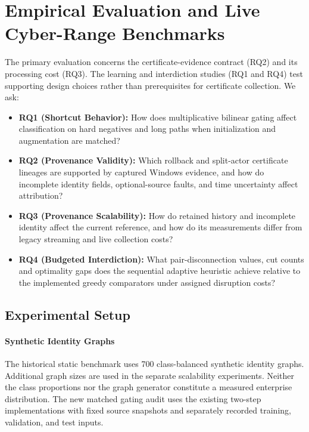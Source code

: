 \section{Empirical Evaluation and Live Cyber-Range Benchmarks}
\label{sec:evaluation}

The primary evaluation concerns the certificate-evidence contract (RQ2) and its processing cost (RQ3). The learning and interdiction studies (RQ1 and RQ4) test supporting design choices rather than prerequisites for certificate collection. We ask:
\begin{itemize}
    \item \textbf{RQ1 (Shortcut Behavior):} How does multiplicative bilinear gating affect classification on hard negatives and long paths when initialization and augmentation are matched?
    \item \textbf{RQ2 (Provenance Validity):} Which rollback and split-actor certificate lineages are supported by captured Windows evidence, and how do incomplete identity fields, optional-source faults, and time uncertainty affect attribution?
    \item \textbf{RQ3 (Provenance Scalability):} How do retained history and incomplete identity affect the current reference, and how do its measurements differ from legacy streaming and live collection costs?
    \item \textbf{RQ4 (Budgeted Interdiction):} What pair-disconnection values, cut counts and optimality gaps does the sequential adaptive heuristic achieve relative to the implemented greedy comparators under assigned disruption costs?
\end{itemize}

\subsection{Experimental Setup}
\paragraph{Synthetic Identity Graphs} The historical static benchmark uses 700 class-balanced synthetic identity graphs. Additional graph sizes are used in the separate scalability experiments. Neither the class proportions nor the graph generator constitute a measured enterprise distribution. The new matched gating audit uses the existing two-step implementations with fixed source snapshots and separately recorded training, validation, and test inputs.


